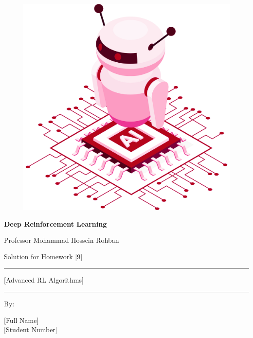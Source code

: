 \documentclass[12pt]{article}
\begin{document}
\thispagestyle{plain}

\begin{center}

\vspace*{-1.5cm}
\begin{figure}[!h]
    \centering
    \includegraphics[width=0.7\linewidth]{figs/cover-std.png}
\end{figure}

{

{\color{DarkBlue} {\fontsize{30}{50} \textbf{
Deep Reinforcement Learning
}}}

{\color{DarkBlue} {\Large
Professor Mohammad Hossein Rohban
}}
}


\vspace{20pt}

{


{\color{RedOrange}
{\Large
Solution for Homework [9]
}\\
}
{\color{BrickRed}
\rule{12cm}{0.5pt}

{\Huge
[Advanced RL Algorithms]
}
\rule{12cm}{0.5pt}
}

\vspace{10pt}

{\color{RoyalPurple} { \small By:} } \\
\vspace{10pt}

{\color{Blue} { \LARGE [Full Name] } } \\
\vspace{5pt}
{\color{RoyalBlue} { \Large [Student Number] } }


}
\end{center}
\end{document}
